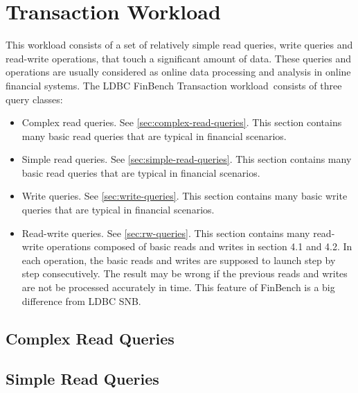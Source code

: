 \chapter{Transaction Workload}
\label{section:transaction-workload}

This workload consists of a set of relatively simple read queries, write queries
and read-write operations, that touch a significant amount of data. These
queries and operations are usually considered as online data processing and
analysis in online financial systems. The LDBC FinBench Transaction workload\
consists of three query classes: 
\begin{itemize}
    \item Complex read queries. See \autoref{sec:complex-read-queries}. This section contains many basic read
    queries that are typical in financial scenarios.
    \item Simple read queries. See \autoref{sec:simple-read-queries}. This section contains many basic read
    queries that are typical in financial scenarios.
    \item Write queries. See \autoref{sec:write-queries}. This section contains many basic
    write queries that are typical in financial scenarios.
    \item Read-write queries. See \autoref{sec:rw-queries}. This section contains many
    read-write operations composed of basic reads and writes in section 4.1 and
    4.2. In each operation, the basic reads and writes are supposed to launch
    step by step consecutively. The result may be wrong if the previous reads
    and writes are not be processed accurately in time. This feature of FinBench
    is a big difference from LDBC SNB.
\end{itemize}

\section{Complex Read Queries}
\label{sec:complex-read-queries}




\section{Simple Read Queries}
\label{sec:simple-read-queries}

